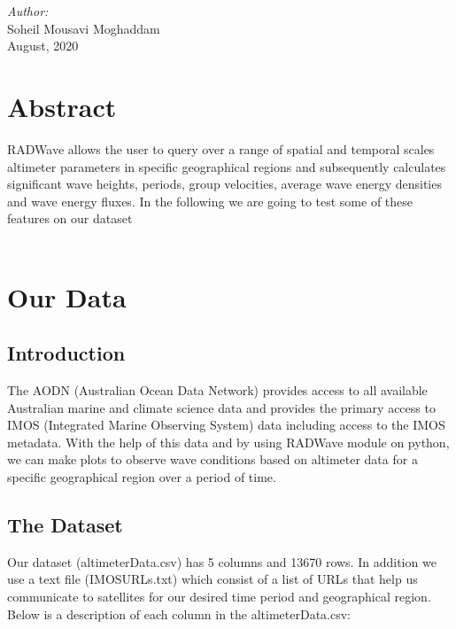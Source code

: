 \documentclass[12pt]{article}
\begin{document}
\begin{titlepage}
\Large \emph{Author:}\\
Soheil Mousavi Moghaddam\\[3cm] %


{\large August, 2020}\\[2cm] %

\vfill %

\end{titlepage}

\newpage

{
  \section*{Abstract}
}
RADWave allows the user to query over a range of spatial and temporal scales altimeter parameters in specific geographical regions and subsequently calculates significant wave heights, periods, group velocities, average wave energy densities and wave energy fluxes. In the following we are going to test some of these features on our dataset \\\\

\section{Our Data}
\subsection{Introduction}
The AODN (Australian Ocean Data Network) provides access to all available Australian marine and climate science data and provides the primary access to IMOS (Integrated Marine Observing System) data including access to the IMOS metadata. With the help of this data and by using RADWave module on python, we can make plots to observe wave conditions based on altimeter data for a specific geographical region over a period of time.
\subsection{The Dataset}
Our dataset (altimeterData.csv) has 5 columns and 13670 rows. In addition we use a text file (IMOSURLs.txt) which consist of a list of URLs that help us communicate to satellites for our desired time period and geographical region. Below is a description of each column in the altimeterData.csv: 
\end{document}

